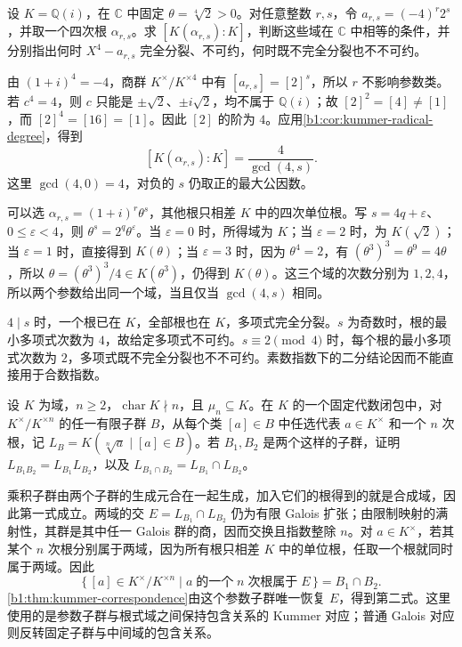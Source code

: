 \begin{exercise}\label{b1:ex:20-8}
	设 \(K=\mathbb Q(i)\)，在 \(\mathbb C\) 中固定 \(\theta=\sqrt[4]{2}>0\)。对任意整数 \(r,s\)，令 \(a_{r,s}=(-4)^r2^s\)，并取一个四次根 \(\alpha_{r,s}\)。求 \([K(\alpha_{r,s}):K]\)，判断这些域在 \(\mathbb C\) 中相等的条件，并分别指出何时 \(X^4-a_{r,s}\) 完全分裂、不可约，何时既不完全分裂也不不可约。
\end{exercise}
\begin{solution}
	由 \((1+i)^4=-4\)，商群 \(K^\times/K^{\times4}\) 中有 \([a_{r,s}]=[2]^s\)，所以 \(r\) 不影响参数类。若 \(c^4=4\)，则 \(c\) 只能是 \(\pm\sqrt2\)、\(\pm i\sqrt2\)，均不属于 \(\mathbb Q(i)\)；故 \([2]^2=[4]\neq[1]\)，而 \([2]^4=[16]=[1]\)。因此 \([2]\) 的阶为 \(4\)。应用\cref{b1:cor:kummer-radical-degree}，得到
	\[
		[K(\alpha_{r,s}):K]=\frac{4}{\gcd(4,s)}.
	\]
	这里 \(\gcd(4,0)=4\)，对负的 \(s\) 仍取正的最大公因数。

	可以选 \(\alpha_{r,s}=(1+i)^r\theta^s\)，其他根只相差 \(K\) 中的四次单位根。写 \(s=4q+\varepsilon\)、\(0\leq\varepsilon<4\)，则 \(\theta^s=2^q\theta^\varepsilon\)。当 \(\varepsilon=0\) 时，所得域为 \(K\)；当 \(\varepsilon=2\) 时，为 \(K(\sqrt2)\)；当 \(\varepsilon=1\) 时，直接得到 \(K(\theta)\)；当 \(\varepsilon=3\) 时，因为 \(\theta^4=2\)，有 \((\theta^3)^3=\theta^9=4\theta\)，所以 \(\theta=(\theta^3)^3/4\in K(\theta^3)\)，仍得到 \(K(\theta)\)。这三个域的次数分别为 \(1,2,4\)，所以两个参数给出同一个域，当且仅当 \(\gcd(4,s)\) 相同。

	\(4\mid s\) 时，一个根已在 \(K\)，全部根也在 \(K\)，多项式完全分裂。\(s\) 为奇数时，根的最小多项式次数为 \(4\)，故给定多项式不可约。\(s\equiv2\pmod4\) 时，每个根的最小多项式次数为 \(2\)，多项式既不完全分裂也不不可约。素数指数下的二分结论因而不能直接用于合数指数。
\end{solution}

\begin{exercise}\label{b1:ex:20-9}
	设 \(K\) 为域，\(n\geq2\)，\(\operatorname{char}K\nmid n\)，且 \(\mu_n\subseteq K\)。在 \(K\) 的一个固定代数闭包中，对 \(K^\times/K^{\times n}\) 的任一有限子群 \(B\)，从每个类 \([a]\in B\) 中任选代表 \(a\in K^\times\) 和一个 \(n\) 次根，记 \(L_B=K(\sqrt[n]{a}\mid [a]\in B)\)。若 \(B_1,B_2\) 是两个这样的子群，证明 \(L_{B_1B_2}=L_{B_1}L_{B_2}\)，以及 \(L_{B_1\cap B_2}=L_{B_1}\cap L_{B_2}\)。
\end{exercise}
\begin{solution}
	乘积子群由两个子群的生成元合在一起生成，加入它们的根得到的就是合成域，因此第一式成立。两域的交 \(E=L_{B_1}\cap L_{B_2}\) 仍为有限 Galois 扩张；由限制映射的满射性，其群是其中任一 Galois 群的商，因而交换且指数整除 \(n\)。对 \(a\in K^\times\)，若其某个 \(n\) 次根分别属于两域，因为所有根只相差 \(K\) 中的单位根，任取一个根就同时属于两域。因此
	\[
		\{\,[a]\in K^\times/K^{\times n}\mid a\;\text{的一个}\;n\;\text{次根属于}\;E\,\} =B_1\cap B_2.
	\]
	\cref{b1:thm:kummer-correspondence}由这个参数子群唯一恢复 \(E\)，得到第二式。这里使用的是参数子群与根式域之间保持包含关系的 Kummer 对应；普通 Galois 对应则反转固定子群与中间域的包含关系。
\end{solution}

